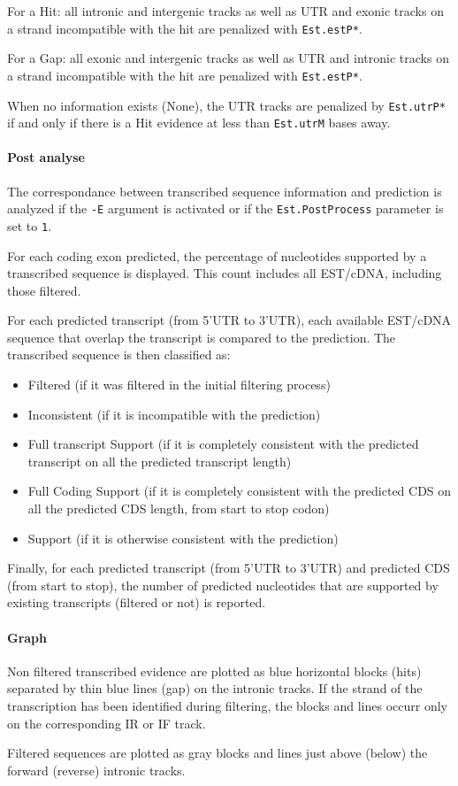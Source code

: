 For a Hit: all intronic and intergenic tracks as well as UTR and
exonic tracks on a strand incompatible with the hit are penalized with
\texttt{Est.estP*}.

For a Gap: all exonic and intergenic tracks as well as UTR and
intronic tracks on a strand incompatible with the hit are penalized with
\texttt{Est.estP*}.

When no information exists (None), the UTR tracks are penalized by
\texttt{Est.utrP*} if and only if there is a Hit evidence at less than
\texttt{Est.utrM} bases away.

\paragraph{Post analyse}

The correspondance between transcribed sequence information and
prediction is analyzed if the \texttt{-E} argument
 is activated or if
the \texttt{Est.PostProcess} parameter is set to \texttt{1}.

For each coding exon predicted, the percentage of nucleotides
supported by a transcribed sequence is displayed. This count includes
all EST/cDNA, including those filtered.

For each predicted transcript (from 5'UTR to 3'UTR), each available
EST/cDNA sequence that overlap the transcript is compared to the
prediction. The transcribed sequence is then  classified as:
\begin{itemize}
\item Filtered (if it was filtered in the initial filtering process)
\item Inconsistent (if it is incompatible with the prediction)
\item Full transcript Support (if it is completely consistent with the
  predicted transcript on all the predicted transcript length)
\item Full Coding Support (if it is completely consistent with the
  predicted CDS on all the predicted CDS length, from start to stop
  codon)
\item Support (if it is otherwise consistent with the prediction)
\end{itemize}

Finally, for each predicted transcript (from 5'UTR to 3'UTR) and
predicted CDS (from start to stop), the number of predicted
nucleotides that are supported by existing transcripts (filtered or
not) is reported.

\paragraph{Graph}

Non filtered transcribed evidence are plotted as blue horizontal
blocks (hits) separated by thin blue lines (gap) on the intronic
tracks. If the strand of the transcription has been identified during
filtering, the blocks and lines occurr only on the corresponding IR or
IF track.

Filtered sequences are plotted as gray blocks and lines just above
(below) the forward (reverse) intronic tracks.

